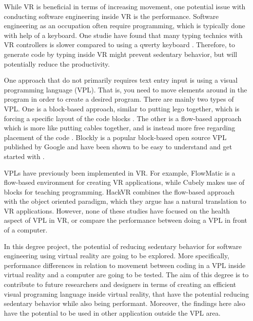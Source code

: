 \documentclass{sigchi}
\begin{document}
While VR is beneficial in terms of increasing movement, one potential issue with conducting software engineering inside VR is the performance. Software engineering as an occupation often require programming, which is typically done with help of a keyboard. One studie have found that many typing technics with VR controllers is slower compared to using a qwerty keyboard \cite{speicher_selection-based_2018}. Therefore, to generate code by typing inside VR might prevent sedentary behavior, but will potentially reduce the productivity.

One approach that do not primarily requires text entry input is using a visual programming language (VPL). That is, you need to move elements around in the program in order to create a desired program. There are mainly two types of VPL. One is a block-based approach, similar to putting lego together, which is forcing a specific layout of the code blocks \cite{mason_block-based_2017}. The other is a flow-based approach which is more like putting cables together, and is instead more free regarding placement of the code \cite{mason_block-based_2017}. Blockly is a popular block-based open source VPL published by Google and have been shown to be easy to understand and get started with \cite{seraj_scratch_2019}. 

VPLs have previously been implemented in VR. For example, FlowMatic \cite{zhang_flowmatic_2020} is a flow-based environment for creating VR applications, while Cubely \cite{vincur_cubely_2017} makes use of blocks for teaching programming. HackVR \cite{kao_hackvr_2020} combines the flow-based approach with the object oriented paradigm, which they argue has a natural translation to VR applications. However, none of these studies have focused on the health aspect of VPL in VR, or compare the performance between doing a VPL in front of a computer.

In this degree project, the potential of reducing sedentary behavior for software engineering using virtual reality are going to be explored. More specifically, performance differences in relation to movement between coding in a VPL inside virtual reality and a computer are going to be tested. The aim of this degree is to contribute to future researchers and designers in terms of creating an efficient visual programing language inside virtual reality, that have the potential reducing sedentary behavior while also being performant. Moreover, the findings here also have the potential to be used in other application outside the VPL area.
\end{document}
